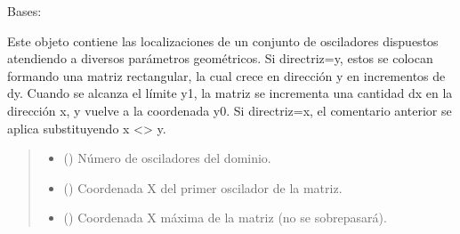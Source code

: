 \documentclass[letterpaper,10pt,english]{sphinxmanual}
\begin{document}
\begin{fulllineitems}
\label{\detokenize{fpga.ring_osc:fpga.ring_osc.Dominio}}
\pysigstartsignatures
{}
\pysigstopsignatures
\sphinxAtStartPar
Bases: 

\sphinxAtStartPar
Este objeto contiene las localizaciones de un conjunto de osciladores dispuestos atendiendo a diversos parámetros geométricos. Si directriz=y, estos se colocan formando una matriz rectangular, la cual crece en dirección y en incrementos de dy. Cuando se alcanza el límite y1, la matriz se incrementa una cantidad dx en la dirección x, y vuelve a la coordenada y0. Si directriz=x, el comentario anterior se aplica substituyendo x \textless{}\sphinxhyphen{}\textgreater{} y.
\begin{quote}\begin{description}
\begin{itemize}
\item {} 
\sphinxAtStartPar
{} (\sphinxstyleliteralemphasis{\sphinxupquote{, }}) \textendash{} Número de osciladores del dominio.

\item {} 
\sphinxAtStartPar
{} (\sphinxstyleliteralemphasis{\sphinxupquote{, }}) \textendash{} Coordenada X del primer oscilador de la matriz.

\item {} 
\sphinxAtStartPar
{} (\sphinxstyleliteralemphasis{\sphinxupquote{, }}) \textendash{} Coordenada X máxima de la matriz (no se sobrepasará).


\end{itemize}
\end{description}
\end{quote}
\end{fulllineitems}
\end{document}
